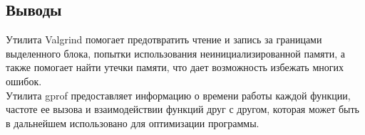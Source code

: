 \documentclass[12pt]{article}
\begin{document}
	\subsection*{Выводы}
	Утилита Valgrind помогает предотвратить чтение и запись за границами выделенного блока, попытки использования неинициализированной памяти, а также помогает найти утечки памяти, что дает возможность избежать многих ошибок.\\
	\indent Утилита gprof предоставляет информацию о времени работы каждой функции, частоте ее вызова и взаимодействии функций друг с другом, которая может быть в дальнейшем использовано для оптимизации программы.

	
\end{document}
